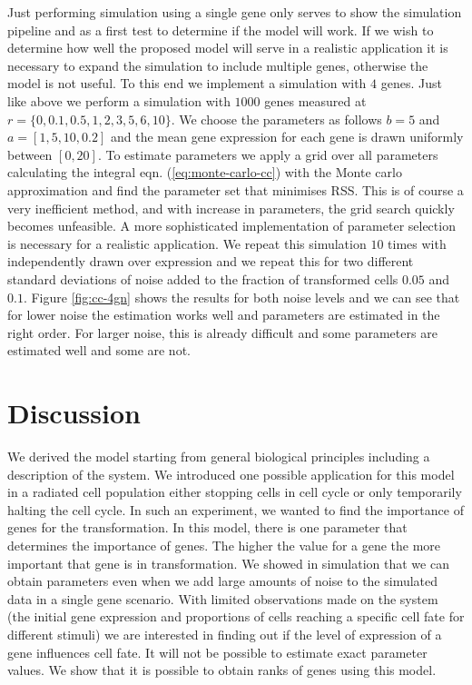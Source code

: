 Just performing simulation using a single gene only serves to show the simulation pipeline and as a first test to determine if the model will work. If we wish to determine how well the proposed model will serve in a realistic application it is necessary to expand the simulation to include multiple genes, otherwise the model is not useful. To this end we implement a simulation with $4$ genes. Just like above we perform a simulation with $1000$ genes measured at $r =\lbrace 0, 0.1, 0.5, 1, 2, 3, 5, 6, 10 \rbrace$. We choose the parameters as follows $b=5$ and $a=[1, 5, 10, 0.2]$ and the mean gene expression for each gene is drawn uniformly between $[0, 20]$. To estimate parameters we apply a grid over all parameters calculating the integral eqn. (\ref{eq:monte-carlo-cc}) with the Monte carlo approximation and find the parameter set that minimises RSS. This is of course a very inefficient  method,  and with increase in parameters, the grid search quickly becomes unfeasible. A more sophisticated implementation of parameter selection is necessary for a realistic application.  We repeat this simulation $10$ times with independently drawn over expression and we repeat this for two different standard deviations of noise added to the fraction of transformed cells $0.05$ and $0.1$. Figure \ref{fig:cc-4gn} shows the results for both noise levels and we can see that for lower noise the estimation works well and parameters are estimated in the right order. For larger noise, this is already difficult and some parameters are estimated well and some are not.



\section{Discussion}
\label{sec:discussion-cc}

We derived the model starting from general biological principles including a description of the system. We introduced one possible application for this model in a radiated cell population either stopping cells in cell cycle or only temporarily halting the cell cycle. In such an experiment, we wanted to find the importance of genes for the transformation.  In this model, there is one parameter that determines the importance of genes. The higher the value for a gene the more important that gene is in transformation. We showed in simulation that we can obtain parameters even when we add large amounts of noise to the simulated data in a single gene scenario. With limited observations made on the system (the initial gene expression and proportions of cells reaching a specific cell fate for different stimuli) we are interested in finding out if the level of expression of a gene influences cell fate. It will not be possible to estimate exact parameter values. We show that it is possible to obtain ranks of genes using this model.

